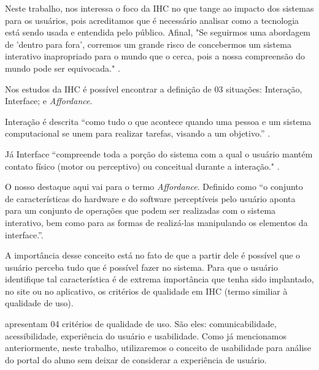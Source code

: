 \documentclass[12pt]{article}
\begin{document}
Neste trabalho, nos interessa o foco da IHC no que tange ao impacto dos sistemas para os usuários, pois acreditamos que é necessário analisar como a tecnologia está sendo usada e entendida pelo público. Afinal, "Se seguirmos uma abordagem de 'dentro para fora', corremos um grande risco de concebermos um sistema interativo inapropriado para o mundo que o cerca, pois a nossa compreensão do mundo pode ser equivocada."  \cite[p. ~30]{barbosa}.

Nos estudos da IHC é possível encontrar a definição de 03 situações: Interação, Interface; e \textit{Affordance}. 

Interação é descrita “como tudo o que acontece quando uma pessoa e um sistema computacional se unem para realizar tarefas, visando a um objetivo.” .

Já Interface “compreende toda a porção do sistema com a qual o usuário mantém contato físico (motor ou perceptivo) ou conceitual durante a interação." .

O nosso destaque aqui vai para o termo \textit{Affordance}. Definido como “o conjunto de características do hardware e do software perceptíveis pelo usuário aponta para um conjunto de operações que podem ser realizadas com o sistema interativo, bem como para as formas de realizá-las manipulando os elementos da interface.”. \cite[p. ~49]{barbosa}

A importância desse conceito está no fato de que a partir dele é possível que o usuário perceba tudo que é possível fazer no sistema. Para que o usuário identifique tal característica é de extrema importância que tenha sido implantado, no site ou no aplicativo, os critérios de qualidade em IHC (termo similiar à qualidade de uso).

 apresentam 04 critérios de qualidade de uso. São eles: comunicabilidade, acessibilidade, experiência do usuário e usabilidade. Como já mencionamos anteriormente, neste trabalho, utilizaremos o conceito de usabilidade para análise do portal do aluno sem deixar de considerar a experiência de usuário.
\end{document}
